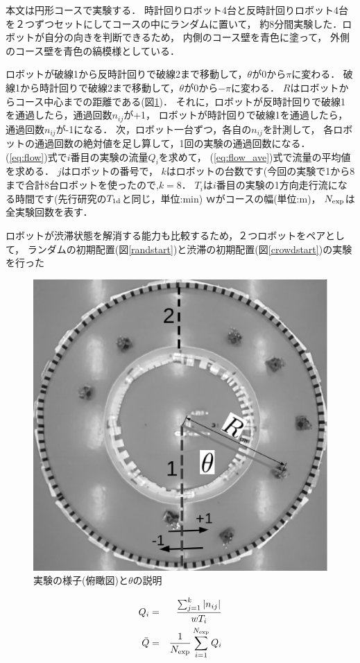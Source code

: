 本文は円形コースで実験する．
時計回りロボット4台と反時計回りロボット4台を２つずつセットにしてコースの中にランダムに置いて，
約8分間実験した．ロボットが自分の向きを判断できるため，
内側のコース壁を青色に塗って，
外側のコース壁を青色の縞模様としている．

ロボットが破線1から反時計回りで破線2まで移動して，$\theta$が0から$\pi$に変わる．
破線1から時計回りで破線2まで移動して，$\theta$が0から$-\pi$に変わる．
$R$はロボットからコース中心までの距離である(図\ref{courseshitar})．
それに，ロボットが反時計回りで破線1を通過したら，通過回数$n_{ij}$が+1，
ロボットが時計回りで破線1を通過したら，通過回数$n_{ij}$が-1になる．
次，ロボット一台ずつ，各自の$n_{ij}$を計測して，
各ロボットの通過回数の絶対値を足し算して，1回の実験の通過回数になる．
(\ref{eq:flow})式で$i$番目の実験の流量$Q_i$を求めて，
(\ref{eq:flow_ave})式で流量の平均値を求める．
$j$はロボットの番号で，
$k$はロボットの台数です(今回の実験で1から8まで合計8台ロボットを使ったので,$k=8$．
$T_i$は$i$番目の実験の1方向走行流になる時間です(先行研究\cite{li}の$T_{\rm 1d}$と同じ，単位:min)
$ｗ$がコースの幅(単位:m)，
$N_{\rm exp}$は全実験回数を表す．

ロボットが渋滞状態を解消する能力も比較するため，２つロボットをペアとして，
ランダムの初期配置(図\ref{randstart})と渋滞の初期配置(図\ref{crowdstart})の実験を行った

\vspace{-1mm}
\begin{figure}[h]
        \centering
        \includegraphics[width=0.6\linewidth]{shitaR.eps}
        \caption{実験の様子(俯瞰図)と$\theta$の説明}
        \label{courseshitar}
\end{figure}

\vspace{-6mm}
\begin{eqnarray}
Q_i &=& \frac{\sum_{j=1}^{k} |n_{ij}|}{wT_i}
\label{eq:flow} \\
\bar{Q} &=& \frac{1}{N_{\rm exp}}\sum_{i=1}^{N_{\rm exp}} Q_i
\label{eq:flow_ave} 
\end{eqnarray}

